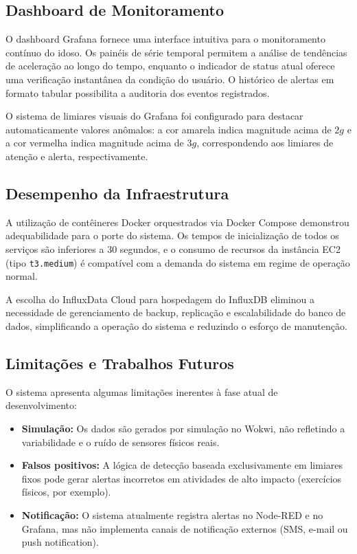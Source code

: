 \documentclass[a4paper,12pt]{article}
\begin{document}
\subsection{Dashboard de Monitoramento}

O dashboard Grafana fornece uma interface intuitiva para o monitoramento contínuo do idoso. Os painéis de série temporal permitem a análise de tendências de aceleração ao longo do tempo, enquanto o indicador de status atual oferece uma verificação instantânea da condição do usuário. O histórico de alertas em formato tabular possibilita a auditoria dos eventos registrados.

O sistema de limiares visuais do Grafana foi configurado para destacar automaticamente valores anômalos: a cor amarela indica magnitude acima de $2g$ e a cor vermelha indica magnitude acima de $3g$, correspondendo aos limiares de atenção e alerta, respectivamente.

\subsection{Desempenho da Infraestrutura}

A utilização de contêineres Docker orquestrados via Docker Compose demonstrou adequabilidade para o porte do sistema. Os tempos de inicialização de todos os serviços são inferiores a 30 segundos, e o consumo de recursos da instância EC2 (tipo \texttt{t3.medium}) é compatível com a demanda do sistema em regime de operação normal.

A escolha do InfluxData Cloud para hospedagem do InfluxDB eliminou a necessidade de gerenciamento de backup, replicação e escalabilidade do banco de dados, simplificando a operação do sistema e reduzindo o esforço de manutenção.

\subsection{Limitações e Trabalhos Futuros}

O sistema apresenta algumas limitações inerentes à fase atual de desenvolvimento:

\begin{itemize}[leftmargin=2cm]
    \item \textbf{Simulação:} Os dados são gerados por simulação no Wokwi, não refletindo a variabilidade e o ruído de sensores físicos reais.
    \item \textbf{Falsos positivos:} A lógica de detecção baseada exclusivamente em limiares fixos pode gerar alertas incorretos em atividades de alto impacto (exercícios físicos, por exemplo).
    \item \textbf{Notificação:} O sistema atualmente registra alertas no Node-RED e no Grafana, mas não implementa canais de notificação externos (SMS, e-mail ou push notification).
\end{itemize}
\end{document}

